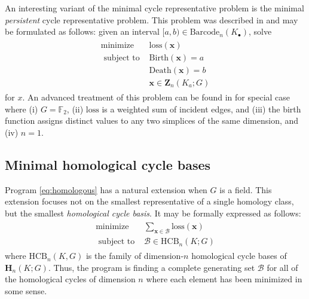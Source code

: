 \documentclass[utf8]{formatting_stuff/frontiersFPHY}
\newcommand{\field}{\mathbb{F}}
\newcommand{\Homologies}[0]{\mathbf{H}}
\newcommand{\Cycles}[0]{\mathbf{Z}}
\newcommand{\optimalrep}{\mathbf{x}}
\newcommand{\birth}{\mathrm{Birth}}
\newcommand{\death}{\mathrm{Death}}
\newcommand{\barcode}{\mathrm{Barcode}}
\newcommand{\loss}{\mathrm{loss}}
\newcommand{\setofhcyclebases}{\mathrm{HCB}}
\newcommand{\pr}{Program }
\newcommand{\hcyclebasis}{\mathcal B}
\theoremstyle{plain}
\theoremstyle{definition}
\begin{document}
An interesting variant of the minimal cycle representative problem is the minimal \emph{persistent} cycle representative problem.  This problem was described in  \cite{chenquantifying} and may be formulated as follows:  given an interval $[a,b) \in \barcode_n(K_\bullet)$, solve 
\begin{align}
   \begin{split}
    \text{minimize } & \loss(\optimalrep) \\
    \text{ subject to } & \birth(\optimalrep) = a \\
    & \death(\optimalrep) = b \\
    & \optimalrep \in \Cycles_n(K_a; G)
   \end{split}
   \label{eq:minbarcoderep}
\end{align}
for $x$.  An advanced treatment of this problem can be found in \cite{chenquantifying} for special case where (i)  $G = \field_2$, (ii) $\loss$ is a weighted sum of incident edges,  and (iii) the birth function assigns distinct values to any two simplices of the same dimension, and (iv) $n=1$.  


\subsection{Minimal homological cycle bases}

\pr \eqref{eq:homologous} has a natural extension when $G$ is a field.  This extension focuses not on the smallest representative of a single homology class, but the smallest  \emph{homological cycle basis}.  It may be formally expressed as follows:
\begin{align}
   \begin{split}
    \text{minimize } & \textstyle \sum_{\optimalrep \in \hcyclebasis} \loss(\optimalrep) \\
    \text{ subject to } & \hcyclebasis \in \setofhcyclebases_n(K ; G)
   \end{split}
   \label{eq:generalminimalbasis}
\end{align}
where $\setofhcyclebases_n(K, G)$ is the family of dimension-$n$ homological cycle bases of $\Homologies_n(K;G)$. Thus, the program is finding a complete generating set $\hcyclebasis$ for all of the homological cycles of dimension $n$ where each element has been minimized in some sense.  
\end{document}
